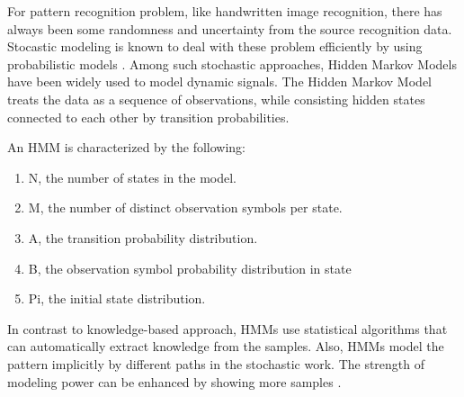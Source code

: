 
For pattern recognition problem, like handwritten image recognition, there has  always been some randomness and uncertainty from the source recognition data. Stocastic modeling is known to deal with these problem efficiently by using probabilistic models \cite{Cho1995}.  Among such stochastic approaches, Hidden Markov Models have been widely used to model dynamic signals.
The Hidden Markov Model treats the data as a sequence of observations, while consisting hidden states connected to each other by transition probabilities.
 
An HMM is characterized by the following\cite{Rabiner1989}:
\begin{enumerate}
\item	N, the number of states in the model.
\item	M, the number of distinct observation symbols per state.
\item	A, the transition probability distribution.
\item	B, the observation symbol probability distribution in state
\item	Pi, the initial state distribution.
\end{enumerate}

In contrast to knowledge-based approach, HMMs use statistical algorithms that can automatically extract knowledge from the samples. Also, HMMs model the pattern implicitly by different paths in the stochastic work. The strength of modeling power can be enhanced by showing more samples
\cite{Cho1995}.
